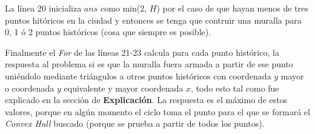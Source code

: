 La línea 20 inicializa $ans$ como min(2, $H$) por el caso de que hayan menos de tres puntos hitóricos en la ciudad
y entonces se tenga que contruir una muralla para 0, 1 ó 2 puntos históricos (cosa que siempre es posible).

Finalmente el \textit{For} de las líneas 21-23 calcula para cada punto histórico, la respuesta al problema
si es que la muralla fuera armada a partir de ese punto uniéndolo mediante triángulos a otros puntos históricos
con coordenada $y$ mayor o coordenada $y$ equivalente y mayor coordenada $x$, todo esto tal como fue explicado
en la sección de \textbf{Explicación}. La respuesta es el máximo de estos valores, porque en algún momento el ciclo
toma el punto para el que se formará el \textit{Convex Hull} buscado (porque se prueba a partir de todos los puntos).

\bigskip


